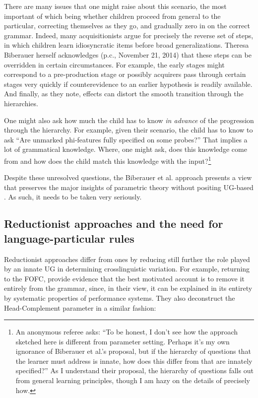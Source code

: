 \documentclass[output=paper,
modfonts
]{LSP/langsci}
\begin{document}
There are many issues that one might raise about this 
scenario, the most important of which being whether children proceed
from general to the particular, correcting themselves as they go, and
gradually zero in on the correct grammar. Indeed, many acquisitionists
argue for precisely the reverse set of steps, in which children learn
idiosyncratic items before broad generalizations. Theresa Biberauer
herself acknowledges (p.c., November 21, 2014) that these steps can be
overridden in certain circumstances. For example, the early stages might
correspond to a pre-production stage or possibly acquirers pass through
certain stages very quickly if counterevidence to an earlier hypothesis
is readily available. And finally, as they note,  effects can
distort the smooth transition through the hierarchies.

One might also ask how much the child has to know \emph{in advance} of
the progression through the hierarchy. For example, given their
scenario, the child has to know to ask ``Are unmarked phi-features fully
specified on some probes?'' That implies a lot of grammatical knowledge.
Where, one might ask, does this knowledge come from and how does the
child match this knowledge with the input?\footnote{An anonymous referee
  asks: ``To be honest, I don't see how the approach sketched here is
  different from parameter setting. Perhaps it's my own ignorance of
  Biberauer et al.'s proposal, but if the hierarchy of questions that
  the learner must address is innate, how does this differ from
   that are innately specified?'' As I understand their
  proposal, the hierarchy of questions falls out from general learning
  principles, though I am hazy on the details of precisely how.}

Despite these unresolved questions, the Biberauer et al. approach
presents a view that preserves the major insights of parametric theory
without positing UG-based . As such, it needs to be taken very
seriously.

\subsection{Reductionist approaches and the need for language-particular rules}\label{sec:newmeyer:7.3}

Reductionist approaches differ from  ones by reducing still
further the role played by an innate UG in determining crosslinguistic
variation. For example, returning to the FOFC, \citet{trotzke2013} provide evidence that the best motivated account is to
remove it entirely from the grammar, since, in their view, it can be
explained in its entirety by systematic properties of performance
systems. They also deconstruct the Head-Complement parameter in a
similar fashion:
\end{document}
